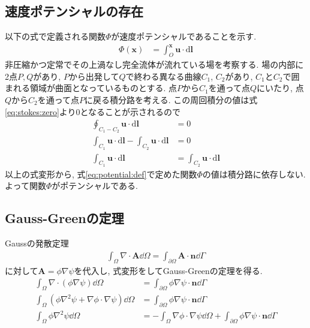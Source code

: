 \documentclass{ltjsarticle}
\begin{document}
\subsection{速度ポテンシャルの存在}
\label{appendix:potential}
以下の式で定義される関数$\Phi$が速度ポテンシャルであることを示す.
\begin{align}
    \Phi(\bm{x}) &= \int_O^{\bm{x}} \bm{u}\cdot\mathrm{d}\bm{l} \label{eq:potential:def}
\end{align}
非圧縮かつ定常でその上渦なし完全流体が流れている場を考察する.
場の内部に2点$P,Q$があり, $P$から出発して$Q$で終わる異なる曲線$C_1$, $C_2$があり,
$C_1$と$C_2$で囲まれる領域が曲面となっているものとする.
点$P$から$C_1$を通って点$Q$にいたり, 点$Q$から$C_2$を通って点$P$に戻る積分路を考える.
この周回積分の値は式\eqref{eq:stokes:zero}より0となることが示されるので
\begin{align}
    \oint_{C_1-C_2}\bm{u}\cdot\mathrm{d}\bm{l} &= 0 \\
    \int_{C_1}\bm{u}\cdot\mathrm{d}\bm{l}-\int_{C_2}\bm{u}\cdot\mathrm{d}\bm{l} &=0\\
    \int_{C_1}\bm{u}\cdot\mathrm{d}\bm{l}&=\int_{C_2}\bm{u}\cdot\mathrm{d}\bm{l}
\end{align}
以上の式変形から, 式\eqref{eq:potential:def}で定めた関数$\Phi$の値は積分路に依存しない.
よって関数$\Phi$がポテンシャルである.

\subsection{Gauss-Greenの定理}
\label{appendix:gauss_green}
Gaussの発散定理
\begin{align}
    \int_\Omega\nabla\cdot\bm{A}\dd{\Omega} =\int_{\partial\Omega}\bm{A}\cdot\bm{n}\dd{\Gamma}
    \label{eq:divergence_theorem}
\end{align}
に対して$\bm{A}=\phi\nabla\psi$を代入し, 式変形をしてGauss-Greenの定理を得る.
\begin{align}
    \int_\Omega\nabla\cdot(\phi\nabla\psi)\dd{\Omega} 
    &=\int_{\partial\Omega}\phi\nabla\psi\cdot\bm{n}\dd{\Gamma} \\
    \int_\Omega(\phi\nabla^2\psi+\nabla\phi\cdot\nabla\psi)\dd{\Omega} 
    &=\int_{\partial\Omega}\phi\nabla\psi\cdot\bm{n}\dd{\Gamma} \\
    \int_\Omega\phi\nabla^2\psi\dd{\Omega} 
    &=- \int_\Omega\nabla\phi\cdot\nabla\psi\dd{\Omega}
    +\int_{\partial\Omega}\phi\nabla\psi\cdot\bm{n}\dd{\Gamma}
\end{align}
\end{document}
